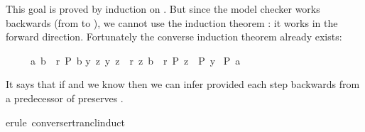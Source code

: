 \begin{isabellebody}
\begin{isamarkuptxt}
\begin{isabelle}
\end{isabelle}
This goal is proved by induction on . But since the model
checker works backwards (from  to ), we cannot use the
induction theorem : it works in the
forward direction. Fortunately the converse induction theorem
 already exists:
\begin{isabelle}%
\ \ \ \ \ {}{}a{}\ b{}\ {}\ r\ P\ b{}\isanewline
{}y\ z{}\ {}{}y{}\ z{}\ {}\ r{}\ {}z{}\ b{}\ {}\ r\ P\ z{}\ {}\ P\ y{}\isanewline
{}\ P\ a%
\end{isabelle}
It says that if  and we know  then we can infer
 provided each step backwards from a predecessor  of
 preserves .%
\end{isamarkuptxt}%
\isamarkuptrue%
\isamarkupfalse%
{}erule\ converse{}rtrancl{}induct{}%

\end{isabellebody}
